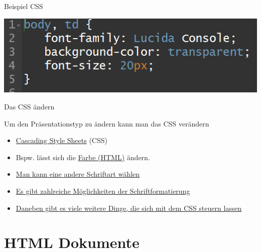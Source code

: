 \documentclass[ignorenonframetext,]{beamer}
\begin{document}
\begin{frame}{Beispiel CSS}

\includegraphics{./tex2pdf.956/7df24f613cbd3ed9e521436f77e2923e64260c99.png}

\end{frame}

\begin{frame}{Das CSS ändern}

Um den Präsentationstyp zu ändern kann man das CSS verändern

\begin{itemize}
\item
  \href{https://de.wikipedia.org/wiki/Cascading_Style_Sheets}{Cascading
  Style Sheets} (CSS)
\item
  Bspw. lässt sich die \href{http://tomheller.de/html-farben.html}{Farbe
  (HTML)} ändern.
\item
  \href{https://www.mediaevent.de/css/font-family.html}{Man kann eine
  andere Schriftart wählen}
\item
  \href{https://wiki.selfhtml.org/wiki/CSS/Eigenschaften/Schriftformatierung}{Es
  gibt zahlreiche Möglichkeiten der Schriftformatierung}
\item
  \href{https://www.w3.org/TR/WCAG20-TECHS/C22.html}{Daneben gibt es
  viele weitere Dinge, die sich mit dem CSS steuern lassen}
\end{itemize}

\end{frame}

\section{HTML Dokumente}\label{html-dokumente}
\end{document}
